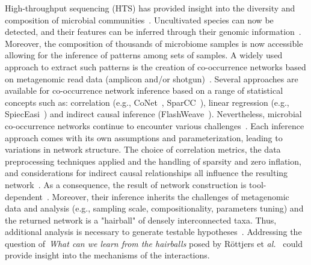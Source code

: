 \documentclass[sn-mathphys,Numbered]{sn-jnl}  %
\theoremstyle{thmstyleone}%
\theoremstyle{thmstyletwo}%
\theoremstyle{thmstylethree}%
\begin{document}
    High-throughput sequencing (HTS) has provided insight into the diversity and composition of microbial communities~\cite{elixir_microbiome}. %
    Uncultivated species can now be detected, and their features can be inferred through their genomic information~\cite{hug2016new}.
    Moreover, the composition of thousands of microbiome samples is now accessible allowing for the inference of patterns among sets of samples.
    A widely used approach to extract such patterns is the creation of co-occurrence networks based on metagenomic read data (amplicon and/or shotgun)~\cite{matchado2021network}. 
    Several approaches are available for co-occurrence network inference based on a range of statistical concepts such as: correlation (e.g., CoNet~\cite{faust2012microbial}, SparCC~\cite{friedman2012inferring}), linear regression (e.g., SpiecEasi~\cite{kurtz2015sparse}) and indirect causal inference (FlashWeave~\cite{flashweave_cite}).
    Nevertheless, microbial co-occurrence networks continue to encounter various challenges~\cite{faust2021open}.
    Each inference approach comes with its own assumptions and parameterization, leading to variations in network structure. 
    The choice of correlation metrics, the data preprocessing techniques applied and the handling of sparsity and zero inflation, and considerations for indirect causal relationships all influence the resulting network~\cite{cao2017inferring}. 
    As a consequence, the result of network construction is tool-dependent~\cite{kishore2023inferring, weiss2016correlation}.
    Moreover, their inference inherits the challenges of metagenomic data and analysis (e.g., sampling scale, compositionality, parameters tuning) and the returned network is a "hairball" of densely interconnected taxa.
    Thus, additional analysis is necessary to generate testable hypotheses~\cite{faust2021open}.
    Addressing the question of~\textit{What can we learn from the hairballs} posed by R{\"o}ttjers et \textit{al.}~\cite{rottjers2018hairballs} could provide insight into the mechanisms of the interactions.
\end{document}
